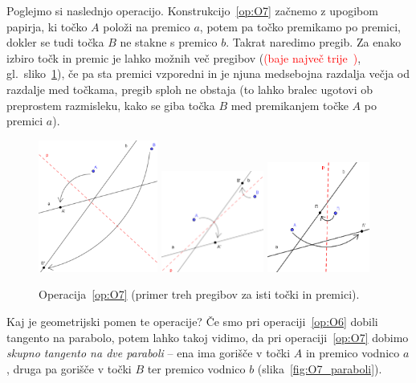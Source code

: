 Poglejmo si naslednjo operacijo. Konstrukcijo~\ref{op:O7} začnemo z upogibom papirja, ki točko $A$ položi na premico $a$, potem pa točko premikamo po premici, dokler se tudi točka $B$ ne stakne s premico $b$. Takrat naredimo pregib. Za enako izbiro točk in premic je lahko možnih več pregibov (\textcolor{red}{(baje največ trije~\cite[str.\ 38 spodaj]{hull2020})}, gl.\ sliko~\ref{fig:O7}), če pa sta premici vzporedni in je njuna medsebojna razdalja večja od razdalje med točkama, pregib sploh ne obstaja (to lahko bralec ugotovi ob preprostem razmisleku, kako se giba točka $B$ med premikanjem točke $A$ po premici $a$).

\begin{figure}[h]
    \centering
    \includegraphics[width=0.35\textwidth]{images/origami_operacije/O7b.png}
    \includegraphics[width=0.3\textwidth]{images/origami_operacije/O7a.png}
    \includegraphics[width=0.3\textwidth]{images/origami_operacije/O7c.png}
    \caption[Operacija~\ref{op:O7}]{Operacija~\ref{op:O7} (primer treh pregibov za isti točki in premici).}
    \label{fig:O7}
\end{figure}

Kaj je geometrijski pomen te operacije? Če smo pri operaciji~\ref{op:O6} dobili tangento na parabolo, potem lahko takoj vidimo, da pri operaciji~\ref{op:O7} dobimo \emph{skupno tangento na dve paraboli} -- ena ima gorišče v točki $A$ in premico vodnico $a$, druga pa gorišče v točki $B$ ter premico vodnico $b$ (slika~\ref{fig:O7_paraboli}).

